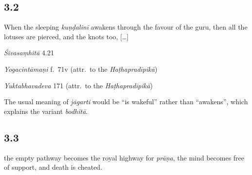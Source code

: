 \begin{ekdosis}
\subsection*{3.2}
\begin{translation}[hp03_002]
When the sleeping \emph{kuṇḍalinī} awakens through the favour of the guru, then all the lotuses are pierced, and the knots too, [\dots] 
\end{translation}

\begin{sources}[hp03_002]
\emph{Śivasaṃhitā} 4.21
\begin{versinnote}
\end{versinnote}
\end{sources}

\begin{testimonia}[hp03_002]
\emph{Yogacintāmaṇi} f.~71v (attr.~to the \emph{Haṭhapradīpikā})
\begin{versinnote}
\end{versinnote}

\emph{Yuktabhavadeva} 171 (attr.~to the \emph{Haṭhapradīpikā})
\begin{versinnote}
\end{versinnote}
\end{testimonia}

\begin{philcomm}[hp03_002]
The usual meaning of \emph{jāgarti} would be “is wakeful” rather than “awakens”, which explains the variant \emph{bodhitā}.
\end{philcomm}

\subsection*{3.3}
\begin{translation}[hp03_003]
[\dots] the empty pathway becomes the royal highway for \emph{prāṇa}, the mind becomes free of support, and death is cheated.
\end{translation}


\end{ekdosis}
